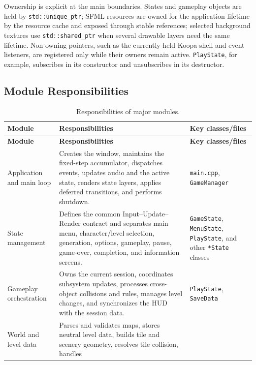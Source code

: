\documentclass{template}
\begin{document}
Ownership is explicit at the main boundaries. States and gameplay objects are
held by \texttt{std::unique\_ptr}; SFML resources are owned for the application
lifetime by the resource cache and exposed through stable references; selected
background textures use \texttt{std::shared\_ptr} when several drawable layers
need the same lifetime. Non-owning pointers, such as the currently held Koopa
shell and event listeners, are registered only while their owners remain
active. \texttt{PlayState}, for example, subscribes in its constructor and
unsubscribes in its destructor.

\subsection{Module Responsibilities}

\begin{longtable}{@{}>{\raggedright\arraybackslash}p{3.2cm}
                        >{\raggedright\arraybackslash}p{6.1cm}
                        >{\raggedright\arraybackslash}p{5.2cm}@{}}
    \caption{Responsibilities of major modules.}\label{tab:modules}\\
    \toprule
    \textbf{Module} & \textbf{Responsibilities} & \textbf{Key classes/files} \\
    \midrule
    \endfirsthead
    \toprule
    \textbf{Module} & \textbf{Responsibilities} & \textbf{Key classes/files} \\
    \midrule
    \endhead
    Application and main loop & Creates the window, maintains the fixed-step
    accumulator, dispatches events, updates audio and the active state, renders
    state layers, applies deferred transitions, and performs shutdown. &
    \texttt{main.cpp}, \texttt{GameManager} \\
    State management & Defines the common Input--Update--Render contract and
    separates main menu, character/level selection, generation, options,
    gameplay, pause, game-over, completion, and information screens. &
    \texttt{GameState}, \texttt{MenuState}, \texttt{PlayState}, and other
    \texttt{*State} classes \\
    Gameplay orchestration & Owns the current session, coordinates subsystem
    updates, processes cross-object collisions and rules, manages level changes,
    and synchronizes the HUD with the session data. & \texttt{PlayState},
    \texttt{SaveData} \\
    World and level data & Parses and validates maps, stores neutral level
    data, builds tile and scenery geometry, resolves tile collision, handles

\end{longtable}
\end{document}
